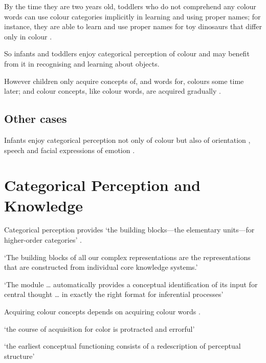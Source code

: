 \documentclass[12pt]{extarticle}
\begin{document}
\begin{multicols}{3}
By the time they are two years old, toddlers who do not comprehend any colour words can use colour categories implicitly in learning and using proper names; for instance, they are able to learn and use proper names for toy dinosaurs that differ only in colour \citep[][Experiment 3]{Soja:1994np}.
 
So infants and toddlers enjoy categorical perception of colour and may benefit from it in recognising and learning about objects.
 
However children only acquire concepts of, and words for, colours some time later; and colour concepts, like colour words, are acquired gradually \citep{Pitchford:2005hm,Kowalski:2006hk,Sandhofer:1999if,Sandhofer:2006qo}.
 
\subsection{Other cases}
 
Infants enjoy categorical perception not only of colour but also of orientation \citep{franklin:2010_hemispheric}, speech \citep{Kuhl:1987la,Kuhl:2004nv,Jusczyk:1995it} and facial expressions of emotion \citep{Etcoff:1992zd,Kotsoni:2001ph,Campanella:2002aa}.
 
 
 
\section{Categorical Perception and Knowledge}
 
Categorical perception provides ‘the building blocks—the elementary units—for higher-order categories’ 
\citep[p.\ 3]{Harnad:1987ej}.
 
‘The building blocks of all our complex representations are the representations that are constructed from individual core knowledge systems.’
\citep[p.\ 307]{Spelke:2003fc}
 
‘The module  … automatically provides a conceptual identification of its input for central thought … in exactly the right format for inferential processes’ 
\citep[pp.\ 193--4]{Leslie:1988ct}
 
Acquiring colour concepts depends on acquiring colour words
\citep{Kowalski:2006hk}.
 
‘the course of acquisition for color is protracted and errorful’
\citep{Sandhofer:2006qo}
 
‘the earliest conceptual functioning consists of a redescription  of perceptual structure’ 
\citep{Mandler:1992vn}
 

\end{multicols}
\end{document}
